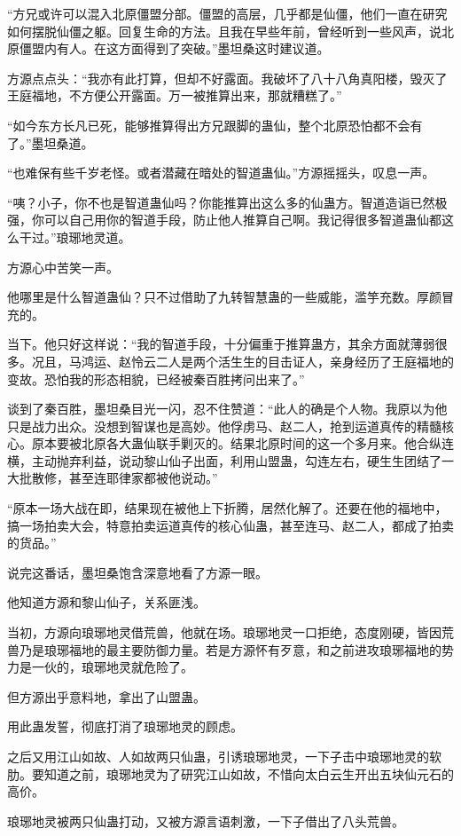 \begin{this_body}
“方兄或许可以混入北原僵盟分部。僵盟的高层，几乎都是仙僵，他们一直在研究如何摆脱仙僵之躯。回复生命的方法。且我在早些年前，曾经听到一些风声，说北原僵盟内有人。在这方面得到了突破。”墨坦桑这时建议道。

方源点点头：“我亦有此打算，但却不好露面。我破坏了八十八角真阳楼，毁灭了王庭福地，不方便公开露面。万一被推算出来，那就糟糕了。”

“如今东方长凡已死，能够推算得出方兄跟脚的蛊仙，整个北原恐怕都不会有了。”墨坦桑道。

“也难保有些千岁老怪。或者潜藏在暗处的智道蛊仙。”方源摇摇头，叹息一声。

“咦？小子，你不也是智道蛊仙吗？你能推算出这么多的仙蛊方。智道造诣已然极强，你可以自己用你的智道手段，防止他人推算自己啊。我记得很多智道蛊仙都这么干过。”琅琊地灵道。

方源心中苦笑一声。

他哪里是什么智道蛊仙？只不过借助了九转智慧蛊的一些威能，滥竽充数。厚颜冒充的。

当下。他只好这样说：“我的智道手段，十分偏重于推算蛊方，其余方面就薄弱很多。况且，马鸿运、赵怜云二人是两个活生生的目击证人，亲身经历了王庭福地的变故。恐怕我的形态相貌，已经被秦百胜拷问出来了。”

谈到了秦百胜，墨坦桑目光一闪，忍不住赞道：“此人的确是个人物。我原以为他只是战力出众。没想到智谋也是高妙。他俘虏马、赵二人，抢到运道真传的精髓核心。原本要被北原各大蛊仙联手剿灭的。结果北原时间的这一个多月来。他合纵连横，主动抛弃利益，说动黎山仙子出面，利用山盟蛊，勾连左右，硬生生团结了一大批散修，甚至连耶律家都被他说动。”

“原本一场大战在即，结果现在被他上下折腾，居然化解了。还要在他的福地中，搞一场拍卖大会，特意拍卖运道真传的核心仙蛊，甚至连马、赵二人，都成了拍卖的货品。”

说完这番话，墨坦桑饱含深意地看了方源一眼。

他知道方源和黎山仙子，关系匪浅。

当初，方源向琅琊地灵借荒兽，他就在场。琅琊地灵一口拒绝，态度刚硬，皆因荒兽乃是琅琊福地的最主要防御力量。若是方源怀有歹意，和之前进攻琅琊福地的势力是一伙的，琅琊地灵就危险了。

但方源出乎意料地，拿出了山盟蛊。

用此蛊发誓，彻底打消了琅琊地灵的顾虑。

之后又用江山如故、人如故两只仙蛊，引诱琅琊地灵，一下子击中琅琊地灵的软肋。要知道之前，琅琊地灵为了研究江山如故，不惜向太白云生开出五块仙元石的高价。

琅琊地灵被两只仙蛊打动，又被方源言语刺激，一下子借出了八头荒兽。


\end{this_body}

